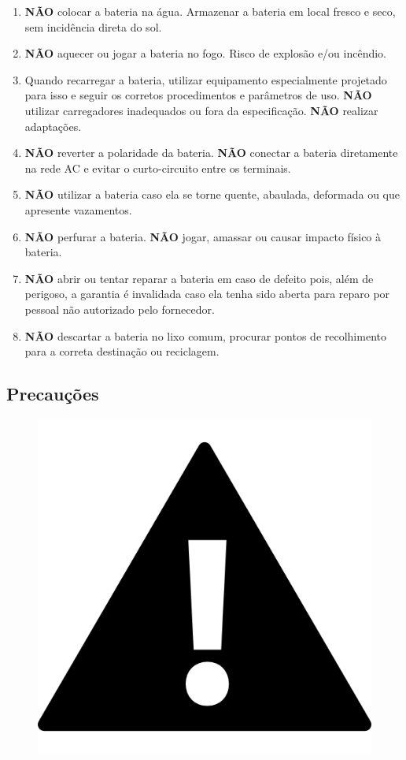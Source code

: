     \begin{enumerate}
    \item \textbf{NÃO} colocar a bateria na água. Armazenar a bateria em local fresco e seco, sem incidência direta do sol.
	\item \textbf{NÃO }aquecer ou jogar a bateria no fogo. Risco de explosão e/ou incêndio. 
\item Quando recarregar a bateria, utilizar equipamento especialmente projetado para isso e seguir os corretos procedimentos e parâmetros de uso. \textbf{NÃO }utilizar carregadores inadequados ou fora da especificação. \textbf{NÃO} realizar adaptações.
\item  \textbf{NÃO} reverter a polaridade da bateria. \textbf{NÃO} conectar a bateria diretamente na rede AC e evitar o curto-circuito entre os terminais.
\item  \textbf{NÃO} utilizar a bateria caso ela se torne quente, abaulada, deformada ou que apresente vazamentos.
\item \textbf{NÃO} perfurar a bateria. \textbf{NÃO } jogar, amassar ou causar impacto físico à bateria.
\item \textbf{NÃO} abrir ou tentar reparar a bateria em caso de defeito pois, além de perigoso, a garantia é invalidada caso ela tenha sido aberta para reparo por pessoal não autorizado pelo fornecedor.
\item \textbf{NÃO} descartar a bateria no lixo comum, procurar pontos de recolhimento para a correta destinação ou reciclagem.
    \end{enumerate}

    \subsection*{Precauções}
\begin{figure}[H]
\centering
	\label{iconeimportante}
		\includegraphics[keepaspectratio=true,scale=1.6]{Figuras/bateria/iconeimportante.png}
	\label{iconeimportante}
	\end{figure} 
    
